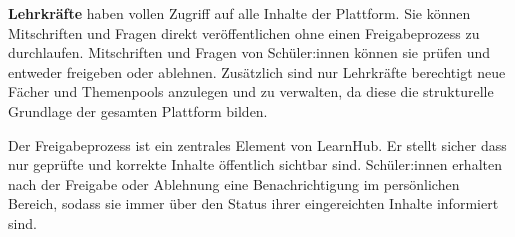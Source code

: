 \textbf{Lehrkräfte} haben vollen Zugriff auf alle Inhalte 
der Plattform. Sie können Mitschriften und Fragen direkt 
veröffentlichen ohne einen Freigabeprozess zu durchlaufen. 
Mitschriften und Fragen von Schüler:innen können sie prüfen 
und entweder freigeben oder ablehnen. Zusätzlich sind nur 
Lehrkräfte berechtigt neue Fächer und Themenpools anzulegen 
und zu verwalten, da diese die strukturelle Grundlage der 
gesamten Plattform bilden.

Der Freigabeprozess ist ein zentrales Element von LearnHub. 
Er stellt sicher dass nur geprüfte und korrekte Inhalte 
öffentlich sichtbar sind. Schüler:innen erhalten nach der 
Freigabe oder Ablehnung eine Benachrichtigung im persönlichen 
Bereich, sodass sie immer über den Status ihrer eingereichten 
Inhalte informiert sind.